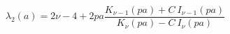 \begin{equation}
\lambda_2(a)=2\nu-4 +2 p a\frac {K_{\nu-1}(p a)+C~ I_{\nu-1}(pa)} {K_\nu(p a)- C~ I_\nu(p
a)}
\end{equation}

